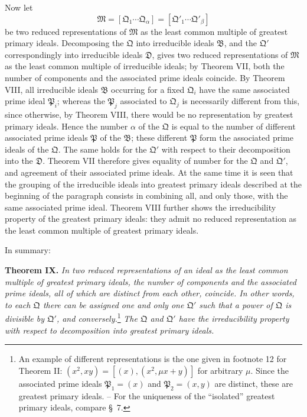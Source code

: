 \documentclass[11pt]{article}
\newcommand{\ideal}[1]{\mathfrak{#1}}
\begin{document}
Now let
\[
 \ideal M=[\ideal Q_1\cdots\ideal Q_\alpha]=[\ideal Q'_1\cdots\ideal Q'_\beta]
\]
be two reduced representations of $\ideal M$ as the least common multiple of greatest primary ideals. Decomposing the $\ideal Q$ into irreducible ideals $\ideal B$, and the $\ideal Q'$ correspondingly into irreducible ideals $\ideal D$, gives two reduced representations of $\ideal M$ as the least common multiple of irreducible ideals; by Theorem VII, both the number of components and the associated prime ideals coincide. By Theorem VIII, all irreducible ideals $\ideal B$ occurring for a fixed $\ideal Q_i$ have the same associated prime ideal $\ideal P_i$; whereas the $\ideal P_j$ associated to $\ideal Q_j$ is necessarily different from this, since otherwise, by Theorem VIII, there would be no representation by greatest primary ideals. Hence the number $\alpha$ of the $\ideal Q$ is equal to the number of different associated prime ideals $\ideal P$ of the $\ideal B$; these different $\ideal P$ form the associated prime ideals of the $\ideal Q$. The same holds for the $\ideal Q'$ with respect to their decomposition into the $\ideal D$. Theorem VII therefore gives equality of number for the $\ideal Q$ and $\ideal Q'$, and agreement of their associated prime ideals. At the same time it is seen that the grouping of the irreducible ideals into greatest primary ideals described at the beginning of the paragraph consists in combining all, and only those, with the same associated prime ideal. Theorem VIII further shows the irreducibility property of the greatest primary ideals: they admit no reduced representation as the least common multiple of greatest primary ideals.

In summary:

\textbf{Theorem IX.} \emph{In two reduced representations of an ideal as the least common multiple of greatest primary ideals, the number of components and the associated prime ideals, all of which are distinct from each other, coincide. In other words, to each $\ideal Q$ there can be assigned one and only one $\ideal Q'$ such that a power of $\ideal Q$ is divisible by $\ideal Q'$, and conversely.}\footnote{An example of different representations is the one given in footnote 12 for Theorem II: $(x^2,xy)=[(x),(x^2,\mu x+y)]$ for arbitrary $\mu$. Since the associated prime ideals $\ideal P_1=(x)$ and $\ideal P_2=(x,y)$ are distinct, these are greatest primary ideals. -- For the uniqueness of the ``isolated'' greatest primary ideals, compare \S~7.} \emph{The $\ideal Q$ and $\ideal Q'$ have the irreducibility property with respect to decomposition into greatest primary ideals.}
\end{document}
